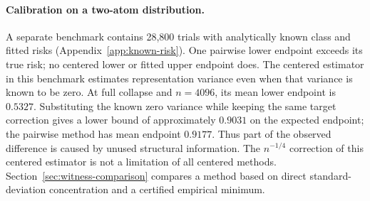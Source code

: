 \paragraph{Calibration on a two-atom distribution.}
A separate benchmark contains 28,800 trials with analytically known class
and fitted risks (Appendix~\ref{app:known-risk}). One pairwise lower endpoint
exceeds its true risk; no centered lower or fitted upper endpoint does.
The centered estimator in this benchmark estimates representation variance
even when that variance is known to be zero. At full collapse and $n=4096$,
its mean lower endpoint is $0.5327$. Substituting the known zero variance while
keeping the same target correction gives a lower bound of approximately
$0.9031$ on the expected endpoint; the pairwise method has mean endpoint $0.9177$. Thus part of the
observed difference is caused by unused structural information. The
$n^{-1/4}$ correction of this centered estimator is not a limitation of all
centered methods. Section~\ref{sec:witness-comparison} compares a method based
on direct standard-deviation concentration and a certified empirical minimum.

